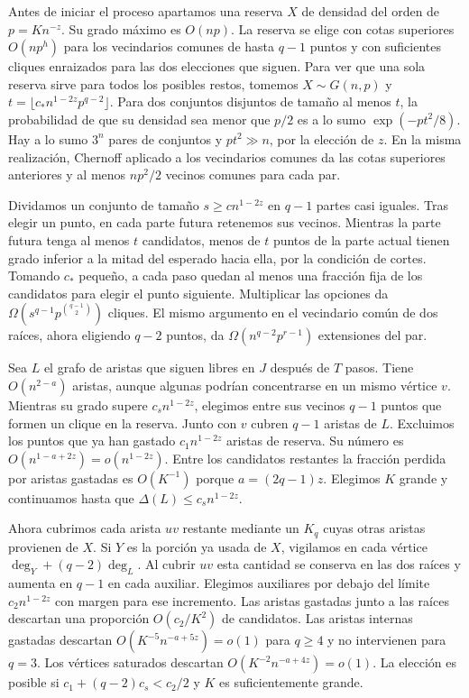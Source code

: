 \documentclass[spanish,11pt,a4paper]{article}
\begin{document}
Antes de iniciar el proceso apartamos una reserva \(X\) de densidad del orden de \(p=K n^{-z}\). Su grado máximo es \(O(np)\). La reserva se elige con cotas superiores \(O(np^h)\) para los vecindarios comunes de hasta \(q-1\) puntos y con suficientes cliques enraizados para las dos elecciones que siguen. Para ver que una sola reserva sirve para todos los posibles restos, tomemos \(X\sim G(n,p)\) y \(t=\lfloor c_* n^{1-2z}p^{q-2}\rfloor\). Para dos conjuntos disjuntos de tamaño al menos \(t\), la probabilidad de que su densidad sea menor que \(p/2\) es a lo sumo \(\exp(-pt^2/8)\). Hay a lo sumo \(3^n\) pares de conjuntos y \(pt^2\gg n\), por la elección de \(z\). En la misma realización, Chernoff aplicado a los vecindarios comunes da las cotas superiores anteriores y al menos \(np^2/2\) vecinos comunes para cada par.

Dividamos un conjunto de tamaño \(s\ge c n^{1-2z}\) en \(q-1\) partes casi iguales. Tras elegir un punto, en cada parte futura retenemos sus vecinos. Mientras la parte futura tenga al menos \(t\) candidatos, menos de \(t\) puntos de la parte actual tienen grado inferior a la mitad del esperado hacia ella, por la condición de cortes. Tomando \(c_*\) pequeño, a cada paso quedan al menos una fracción fija de los candidatos para elegir el punto siguiente. Multiplicar las opciones da \(\Omega(s^{q-1}p^{\binom{q-1}2})\) cliques. El mismo argumento en el vecindario común de dos raíces, ahora eligiendo \(q-2\) puntos, da \(\Omega(n^{q-2}p^{r-1})\) extensiones del par.

Sea \(L\) el grafo de aristas que siguen libres en \(J\) después de \(T\) pasos. Tiene \(O(n^{2-a})\) aristas, aunque algunas podrían concentrarse en un mismo vértice \(v\). Mientras su grado supere \(c_s n^{1-2z}\), elegimos entre sus vecinos \(q-1\) puntos que formen un clique en la reserva. Junto con \(v\) cubren \(q-1\) aristas de \(L\). Excluimos los puntos que ya han gastado \(c_1 n^{1-2z}\) aristas de reserva. Su número es \(O(n^{1-a+2z})=o(n^{1-2z})\). Entre los candidatos restantes la fracción perdida por aristas gastadas es \(O(K^{-1})\) porque \(a=(2q-1)z\). Elegimos \(K\) grande y continuamos hasta que \(\Delta(L)\le c_s n^{1-2z}\).

Ahora cubrimos cada arista \(uv\) restante mediante un \(K_q\) cuyas otras aristas provienen de \(X\). Si \(Y\) es la porción ya usada de \(X\), vigilamos en cada vértice \(\deg_Y+(q-2)\deg_L\). Al cubrir \(uv\) esta cantidad se conserva en las dos raíces y aumenta en \(q-1\) en cada auxiliar. Elegimos auxiliares por debajo del límite \(c_2 n^{1-2z}\) con margen para ese incremento. Las aristas gastadas junto a las raíces descartan una proporción \(O(c_2/K^2)\) de candidatos. Las aristas internas gastadas descartan \(O(K^{-5}n^{-a+5z})=o(1)\) para \(q\ge4\) y no intervienen para \(q=3\). Los vértices saturados descartan \(O(K^{-2}n^{-a+4z})=o(1)\). La elección es posible si \(c_1+(q-2)c_s<c_2/2\) y \(K\) es suficientemente grande.
\end{document}
